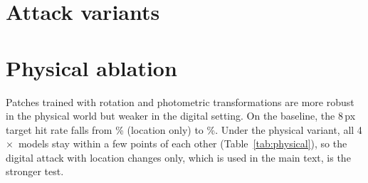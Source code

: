 \documentclass[10pt]{article}
\newcommand{\x}{$\times$}
\begin{document}
\begin{table}[h]
\centering
\caption{Second settings (\%): clean accuracy, accuracy under the universal 8\,px patch (56\,px on ImageNette), LaVAN 5\,px
(35\,px) robust accuracy, defended clean and certified accuracy, and transfer from the full model. Mean {\scriptsize$\pm$
std} over seeds.}
\label{tab:settings}
\small
\setlength{\tabcolsep}{3pt}

\end{table}

\begin{table}[h]
\centering
\caption{Second settings: paired differences (pp) {\scriptsize[95\% $t$-interval over seeds]}; bold means that the
interval excludes zero. ImageNette has one seed, so its differences have no intervals, except for certification (image
bootstrap).}
\label{tab:settings_diffs}
\small

\end{table}

\section{Attack variants}
\label{app:variants}

\begin{table}[h]
\centering
\caption{CIFAR-10: targeted against untargeted universal patches (accuracy with the patch), and LaVAN with cross-entropy
against the Carlini--Wagner margin loss (5\,px robust accuracy and targeted hit rate; the margin loss was run on the
baseline and the 4\x\ arms). Mean {\scriptsize$\pm$ std} over  seeds (\%).}
\label{tab:j9}
\small
\setlength{\tabcolsep}{2.5pt}

\end{table}

\section{Physical ablation}
\label{app:physical}

Patches trained with rotation and photometric transformations are more robust in the physical world but weaker in the
digital setting. On the baseline, the 8\,px target hit rate falls from \% (location only)
to \%. Under the physical variant, all 4\x\ models stay within a few points of each other
(Table~\ref{tab:physical}), so the digital attack with location changes only, which is used in the main text, is the
stronger test.

\begin{table}[h]
\centering
\caption{Universal 8\,px patch, seed 42: location-only against physical transformations, accuracy and target hit rate
(\%).}
\label{tab:physical}
\small

\end{table}
\end{document}
